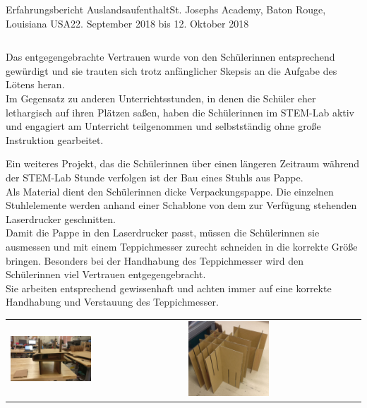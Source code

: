 \documentclass[oneside,openany,headings=optiontotoc,11pt,numbers=noenddot]{article}
\begin{document}
\begin{worksheet}{Erfahrungsbericht Auslandsaufenthalt}{St. Joseph\grq{}s Academy, Baton Rouge, Louisiana USA}{22. September 2018 bis 12. Oktober 2018}
\begin{center}
\begin{tabularx}{\textwidth}{XX}
			\end{tabularx}
		\end{center}
		Das entgegengebrachte Vertrauen wurde von den Schülerinnen entsprechend gewürdigt und sie trauten sich trotz anfänglicher Skepsis an die Aufgabe des Lötens heran.\\
		Im Gegensatz zu anderen Unterrichtsstunden, in denen die Schüler eher lethargisch auf ihren Plätzen saßen, haben die Schülerinnen im STEM-Lab aktiv und engagiert am Unterricht teilgenommen und selbstständig ohne große Instruktion gearbeitet.\\
		\par\noindent
		Ein weiteres Projekt, das die Schülerinnen über einen längeren Zeitraum während der STEM-Lab Stunde verfolgen ist der Bau eines Stuhls aus Pappe.\\Als Material dient den Schülerinnen dicke Verpackungspappe. Die einzelnen Stuhlelemente werden anhand einer Schablone von dem zur Verfügung stehenden Laserdrucker geschnitten.\\
		Damit die Pappe in den Laserdrucker passt, müssen die Schülerinnen sie ausmessen und mit einem Teppichmesser zurecht schneiden in die korrekte Größe bringen. Besonders bei der Handhabung des Teppichmesser wird den Schülerinnen viel Vertrauen entgegengebracht.\\
		Sie arbeiten entsprechend gewissenhaft und achten immer auf eine korrekte Handhabung und Verstauung des Teppichmesser.
		\begin{center}
			\begin{tabularx}{\textwidth}{XX}
				\includegraphics[width=0.48\textwidth,align=t]{../99_Bilder/00_chair.jpg} & \includegraphics[width=0.48\textwidth,align=t]{../99_Bilder/01_chair.jpg}

\end{tabularx}
\end{center}
\end{worksheet}
\end{document}
